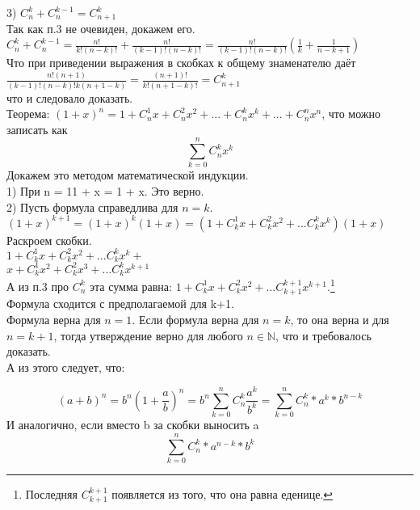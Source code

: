 \documentclass[a4paper,12pt]{article}
\begin{document}
3) $C_{n}^k + C_n^{k-1} = C_{n+1}^k$\\
Так как п.3 не очевиден, докажем его.\\
$C_{n}^k+C_n^{k-1}=\frac{n!}{k!(n-k)!}+\frac{n!}{(k-1)!(n-k)!}=\frac{n!}{(k-1)!(n-k)!}\left(\frac{1}{k} + \frac{1}{n-k+1}\right)$\\
Что при приведении выражения в скобках к общему знаменателю даёт\\
$\frac{n!(n+1)}{(k-1)!(n-k)!k(n+1-k)}=\frac{(n+1)!}{k!(n+1-k)!}=C_{n+1}^k$\\
что и следовало доказать.\\[1cm]
Теорема:
$(1+x)^n=1+C_{n}^1x + C_{n}^2x^2 +... + C_{n}^kx^k + ... + C_{n}^nx^n$, что можно записать как
\[\sum_{k=0}^{n}C_{n}^kx^k\]
Докажем это методом математической индукции.\\
1) При n = 1\hspace{50pt}1 + x = 1 + x. \hspace{50pt} Это верно.\\
2) Пусть формула справедлива для $n=k$.\\
$(1+x)^{k+1}=(1+x)^k(1+x)=\left(1+C_{k}^1x+C_{k}^2x^2+...C_{k}^kx^k\right)(1+x)$\\
Раскроем скобки.\\
$1+C_{k}^1x+C_{k}^2x^2+...C_{k}^kx^k+$\\
$x+C_{k}^1x^2+C_{k}^2x^3+...C_{k}^kx^{k+1}$\\
А из п.3 про $C_{n}^k$ эта сумма равна:
$1 + C_{k}^1x + C_{k}^2x^2+...C_{k+1}^{k+1}x^{k+1}$.\footnote{Последняя $C_{k+1}^{k+1}$ появляется из того, что она равна еденице.}\\
Формула сходится с предполагаемой для k+1.\\
Формула верна для $n = 1$. Если формула верна для $n=k$, то она верна и для $n=k+1$, тогда утверждение верно для любого $n\in\mathbb{N}$, что и требовалось доказать.\\
А из этого следует, что:

\[(a+b)^n = b^n(1+\frac{a}{b})^n = b^n\sum^n_{k=0}C_{n}^k\frac{a^k}{b^k}=\sum_{k=0}^nC_{n}^k*a^k*b^{n-k}\]
И аналогично, если вместо b за скобки выносить a
\[\sum_{k=0}^nC_{n}^k*a^{n - k}*b^k\]
\end{document}
